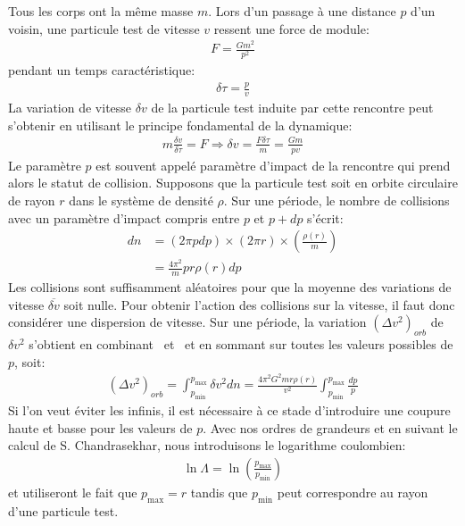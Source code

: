 Tous les corps ont la même masse $m$. Lors d'un passage à une distance $p$ d'un voisin, une particule test de vitesse $v$ ressent une force de module:
\begin{align*}
	F=\frac{Gm^{2}}{p^{2}}%
\end{align*}
pendant un temps caractéristique:
\begin{align*}
	\delta\tau=\frac{p}{v}
\end{align*}
La variation de vitesse $\delta v$ de la particule test induite par cette rencontre peut s'obtenir en utilisant le principe fondamental de la dynamique:
\begin{align}
	m\frac{\delta v}{\delta\tau}=F\Rightarrow\delta v=\frac{F\delta\tau}{m}=\frac{Gm}{pv} \label{deltavrel}
\end{align}
Le paramètre $p$ est souvent appelé paramètre d'impact de la rencontre qui prend alors le statut de collision. Supposons que la particule test soit
en orbite circulaire de rayon $r$ dans le système de densité $\rho$. Sur une période, le nombre de collisions avec
un paramètre d'impact compris entre $p$ et $p+dp$ s'écrit:
\begin{align}
	dn  &= \left(  2\pi pdp\right)  \times\left(  2\pi r\right)  \times\left(\frac{\rho\left(  r\right)  }{m}\right) \label{dnrel}\\
	    &= \frac{4\pi^{2}}{m}pr\rho\left(  r\right)  dp
\end{align}
Les collisions sont suffisamment aléatoires pour que la moyenne des variations de vitesse $\overline{\delta v}$ soit nulle. Pour obtenir l'action des
collisions sur la vitesse, il faut donc considérer une dispersion de vitesse. Sur une période, la variation $\left(\Delta v^{2}\right)_{orb}$ de
$\delta v^{2}$ s'obtient en combinant~ et~ et en sommant sur toutes les valeurs possibles de $p$, soit:
\begin{align*}
	\left(\Delta v^{2}\right)_{orb}=\int_{p_{\min}}^{p_{\max}}\delta v^{2}dn=\frac{4\pi^{2}G^{2}mr\rho\left(r\right)}{v^{2}}\int_{p_{\min}}^{p_{\max}}\frac{dp}{p}
\end{align*}
Si l'on veut éviter les infinis, il est nécessaire à ce stade d'introduire une coupure haute et basse pour les valeurs de $p$. Avec nos ordres de
grandeurs et en suivant le calcul de S. Chandrasekhar, nous introduisons le logarithme coulombien:
\begin{align*}
	\ln\Lambda=\ln\left(\frac{p_{\max}}{p_{\min}}\right)
\end{align*}
et utiliseront le fait que $p_{\max}=r$ tandis que $p_{\min}$ peut correspondre au rayon d'une particule test.
